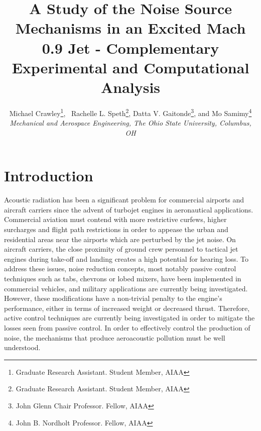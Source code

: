 \documentclass[english]{aiaa-tc}
\begin{document}
\title{A Study of the Noise Source Mechanisms in an Excited Mach 0.9 Jet - Complementary Experimental and Computational Analysis}


\author{Michael Crawley\thanks{Graduate Research Assistant. Student Member, AIAA}, \
Rachelle L. Speth\thanks{Graduate Research Assistant. Student Member, AIAA},
 Datta V. Gaitonde\thanks{John Glenn Chair Professor. Fellow, AIAA},
 and Mo Samimy\thanks{John B. Nordholt Professor. Fellow, AIAA}
\\\normalsize\itshape Mechanical and Aerospace Engineering, The Ohio State University, Columbus, OH \\}


\maketitle

\section{Introduction}

 Acoustic radiation has been a significant problem for commercial airports and aircraft carriers since the advent of turbojet engines in aeronautical applications. Commercial aviation must contend with more restrictive curfews, higher surcharges and flight path restrictions in order to appease the urban and residential areas near the airports which are perturbed by the jet noise. On aircraft carriers, the close proximity of ground crew personnel to tactical jet engines during take-off and landing creates a high potential for hearing loss. To address these issues, noise reduction concepts, most notably passive control techniques such as tabs, chevrons or lobed mixers, have been implemented in commercial vehicles, and military applications are currently being investigated. However, these modifications have a non-trivial penalty to the engine's performance, either in terms of increased weight or decreased thrust. Therefore, active control techniques are currently being investigated in order to mitigate the losses seen from passive control. In order to effectively control the production of noise, the mechanisms that produce aeroacoustic pollution  must be well understood. 
\end{document}
